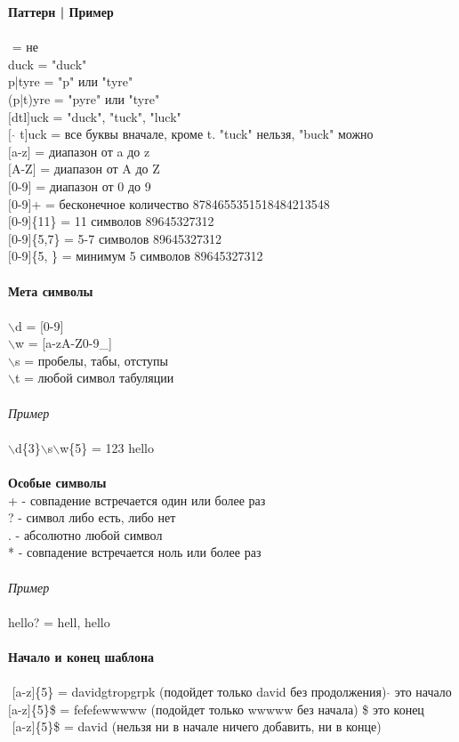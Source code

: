 \documentclass[a4paper, 12px]{article}
\begin{document}
\textbf{Паттерн | Пример} \\\\
$\hat{}$ = не \\
duck = "duck"\\
p|tyre = "p" или "tyre"\\
(p|t)yre = "pyre" или "tyre"\\
$[$dtl$]$uck = "duck", "tuck", "luck" \\
$[$ $\hat{}$ t]uck = все буквы вначале, кроме t. "tuck" нельзя, "buck" можно \\
$[$a-z$]$ = диапазон от a до z \\
$[$A-Z$]$ = диапазон от A до Z \\
$[$0-9$]$ = диапазон от 0 до 9 \\
$[$0-9$]$+ = бесконечное количество 8784655351518484213548 \\
$[$0-9$]$\{11\} = 11 символов 89645327312 \\
$[$0-9$]$\{5,7\} = 5-7 символов 89645327312 \\
$[$0-9$]$\{5, \} = минимум 5 символов 89645327312 \\\\
\textbf{Мета символы}\\\\
$\backslash$d = [0-9] \\
$\backslash$w = [a-zA-Z0-9\_] \\
$\backslash$s = пробелы, табы, отступы \\
$\backslash$t = любой символ табуляции \\\\
\textit{Пример}\\\\
$\backslash$d\{3\}$\backslash$s$\backslash$w\{5\} = 123 hello \\\\
\textbf{Особые символы} \\
+ - совпадение встречается один или более раз \\
? - символ либо есть, либо нет \\
. - абсолютно любой символ \\
* - совпадение встречается ноль или более раз \\\\
\textit{Пример}\\\\
hello? = hell, hello \\\\
\textbf{Начало и конец шаблона} \\\\
$\hat{}$ [a-z]\{5\} = davidgtropgrpk (подойдет только david без продолжения) $\hat{}$ это начало \\
$[$a-z$]$\{5\}\$ = fefefewwwww (подойдет только wwwww без начала) \$ это конец \\
$\hat{}$ $[$a-z$]$\{5\}\$ = david (нельзя ни в начале ничего добавить, ни в конце) \\
\end{document}
